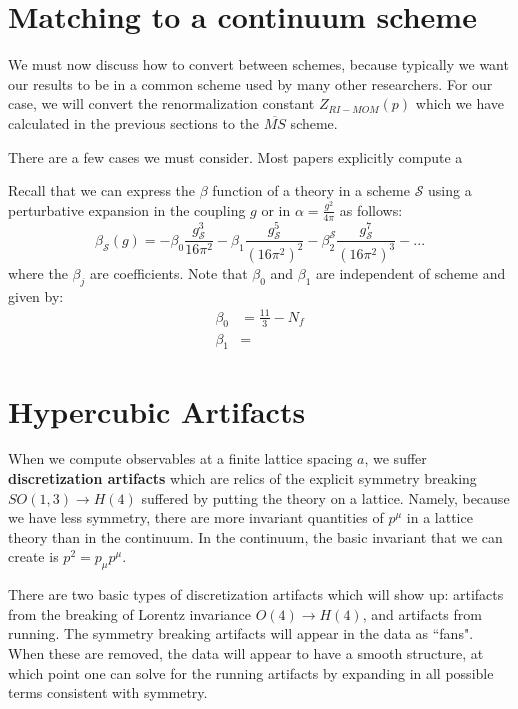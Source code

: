 \documentclass[11pt, oneside]{article}   	%
\theoremstyle{definition}
\begin{document}
\section{Matching to a continuum scheme}

We must now discuss how to convert between schemes, because typically we want our results to be in a common scheme 
used by many other researchers. For our case, we will convert the renormalization constant $Z_{RI-MOM}(p)$ which we 
have calculated in the previous sections to the $\overline{MS}$ scheme. 

There are a few cases we must consider. Most papers explicitly compute a 

Recall that we can express the $\beta$ function of a theory in a scheme $\mathcal S$ using a perturbative expansion in the 
coupling $g$ or in $\alpha = \frac{g^2}{4\pi}$ as follows:
\begin{equation}
	\beta_\mathcal{S}(g) = -\beta_0\frac{g_\mathcal{S}^3}{16\pi^2} - \beta_1\frac{g_\mathcal{S}^5}{(16\pi^2)^2} 
	- \beta_2^\mathcal{S} \frac{g_\mathcal{S}^7}{(16\pi^2)^3} - ... 
\end{equation}
where the $\beta_j$ are coefficients. Note that $\beta_0$ and $\beta_1$ are independent of scheme and given by:
\begin{align}
	\beta_0 &= \frac{11}{3} - N_f \\
	\beta_1 &= 
\end{align}

\section{Hypercubic Artifacts}
\label{sec:artifacts}

When we compute observables at a finite lattice spacing $a$, we suffer \textbf{discretization artifacts} which are relics of the 
explicit symmetry breaking $SO(1, 3)\rightarrow H(4)$ suffered by putting the theory on a lattice. Namely, because we have 
less symmetry, there are more invariant quantities of $p^\mu$ in a lattice theory than in the continuum. In the continuum, the 
basic invariant that we can create is $p^2 = p_\mu p^\mu$. 

There are two basic types of discretization artifacts which will show up: artifacts from the breaking of Lorentz invariance 
$O(4)\rightarrow H(4)$, and artifacts from running. The symmetry breaking artifacts will appear in the data as ``fans". 
When these are removed, the data will appear to have a smooth structure, at which point one can solve for the running 
artifacts by expanding in all possible terms consistent with symmetry. 
\end{document}
